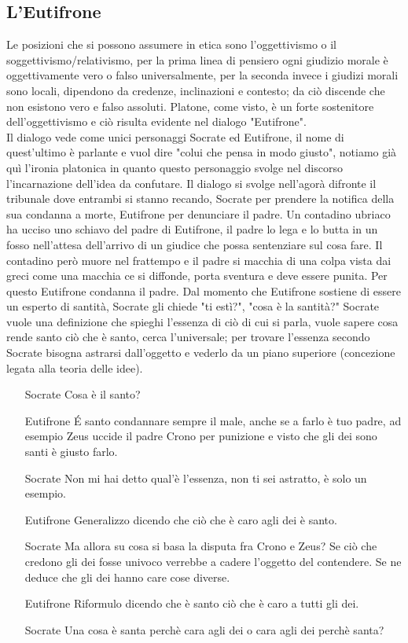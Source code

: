 \documentclass[10pt,a4paper]{article}
\begin{document}
\subsection{L'Eutifrone}
Le posizioni che si possono assumere in etica sono l'oggettivismo o il soggettivismo/relativismo, per la prima linea di pensiero ogni giudizio morale è oggettivamente vero o falso universalmente, per la seconda invece i giudizi morali sono locali, dipendono da credenze, inclinazioni e contesto; da ciò discende che non esistono vero e falso assoluti. Platone, come visto, è un forte sostenitore dell'oggettivismo e ciò risulta evidente nel dialogo "Eutifrone".\\
Il dialogo vede come unici personaggi Socrate ed Eutifrone, il nome di quest'ultimo è parlante e vuol dire "colui che pensa in modo giusto", notiamo già quì l'ironia platonica in quanto questo personaggio svolge nel discorso l'incarnazione dell'idea da confutare. Il dialogo si svolge nell'agorà difronte il tribunale dove entrambi si stanno recando, Socrate per prendere la notifica della sua condanna a morte, Eutifrone per denunciare il padre. Un contadino ubriaco ha ucciso uno schiavo del padre di Eutifrone, il padre lo lega e lo butta in un fosso nell'attesa dell'arrivo di un giudice che possa sentenziare sul cosa fare. Il contadino però muore nel frattempo e il padre si macchia di una colpa vista dai greci come una macchia ce si diffonde, porta sventura e deve essere punita. Per questo Eutifrone condanna il padre. Dal momento che Eutifrone sostiene di essere un esperto di santità, Socrate gli chiede "ti estì?", "cosa è la santità?"  Socrate vuole una definizione che spieghi l'essenza di ciò di cui si parla, vuole sapere cosa rende santo ciò che è santo, cerca l'universale; per trovare l'essenza secondo Socrate bisogna astrarsi dall'oggetto e vederlo da un piano superiore (concezione legata alla teoria delle idee). 
\begin{itemize}
	\item[Socrate] Cosa è il santo?
	\item[Eutifrone] \'E santo condannare sempre il male, anche se a farlo è tuo padre, ad esempio Zeus uccide il padre Crono per punizione e visto che gli dei sono santi è giusto farlo.
	\item[Socrate] Non mi hai detto qual'è l'essenza, non ti sei astratto, è solo un esempio.
	\item[Eutifrone] Generalizzo dicendo che ciò che è caro agli dei è santo.
	\item[Socrate] Ma allora su cosa si basa la disputa fra Crono e Zeus? Se ciò che credono gli dei fosse univoco verrebbe a cadere l'oggetto del contendere. Se ne deduce che gli dei hanno care cose diverse.
	\item[Eutifrone] Riformulo dicendo che è santo ciò che è caro a tutti gli dei. 
	\item[Socrate] Una cosa è santa perchè cara agli dei o cara agli dei perchè santa?
\end{itemize} 
\end{document}
